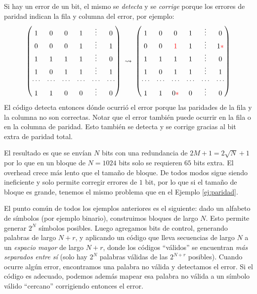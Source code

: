 \begin{ejemplo}
    Si hay un error de un bit, el mismo se \emph{detecta} y se \emph{corrige} porque los errores de paridad indican la fila y columna del error, por ejemplo:
    \begin{equation*}
         \begin{pmatrix}
            1 & 0 & 0 & 1 & \vdots & 0 \\
            0 & 0 & 0 & 1 & \vdots & 1 \\
            1 & 1 & 1 & 1 & \vdots & 0 \\
            1 & 0 & 1 & 1 & \vdots & 1 \\
            \cdots & \cdots & \cdots & \cdots & \cdots & \cdots \\
            1 & 1 & 0 & 0 & \vdots & 0 \\
        \end{pmatrix} \; \rightsquigarrow  \;
         \begin{pmatrix}
            1 & 0 & 0 & 1 & \vdots & 0 \\
            0 & 0 & {\color{red} 1} & 1 & \vdots & 1{\color{red} *} \\
            1 & 1 & 1 & 1 & \vdots & 0 \\
            1 & 0 & 1 & 1 & \vdots & 1 \\
            \cdots & \cdots & \cdots & \cdots & \cdots & \cdots \\
            1 & 1 & 0{\color{red} *} & 0 & \vdots & 0 \\
        \end{pmatrix}
    \end{equation*}
    El código detecta entonces dónde ocurrió el error porque las paridades de la fila y la columna no son correctas. Notar que el error también puede ocurrir en la fila o en la columna de paridad. Esto también se detecta y se corrige gracias al bit extra de paridad total.

    El resultado es que se envían $N$ bits con una redundancia de $2M+1 = 2\sqrt{N} + 1$ por lo que en un bloque de $N=1024$ bits solo se requieren $65$ bits extra. El overhead crece más lento que el tamaño de bloque. De todos modos sigue siendo ineficiente y solo permite corregir errores de $1$ bit, por lo que si el tamaño de bloque es grande, tenemos el mismo problema que en el Ejemplo \ref{ej:paridad}.
\end{ejemplo}

El punto común de todos los ejemplos anteriores es el siguiente: dado un alfabeto de símbolos (por ejemplo binario), construimos bloques de largo $N$. Esto permite generar $2^N$ símbolos posibles. Luego agregamos bits de control, generando palabras de largo $N+r$, y aplicando un código que lleva secuencias de largo $N$ a un \emph{espacio mayor} de largo $N+r$, donde los códigos ``válidos'' se encuentran \emph{más separados entre sí} (solo hay $2^N$ palabras válidas de las $2^{N+r}$ posibles). Cuando ocurre algún error, encontramos una palabra no válida y detectamos el error. Si el código es adecuado, podemos además mapear esa palabra no válida a un símbolo válido ``cercano'' corrigiendo entonces el error.

